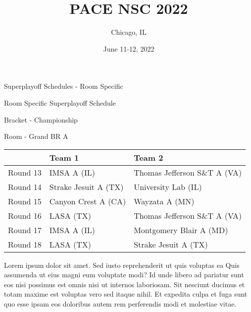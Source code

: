 \documentclass{article}%
\title{PACE NSC 2022}%
\author{Chicago, IL}%
\date{June 11{-}12, 2022}%
\begin{document}
%
\normalsize%
%
\maketitle%
\vspace*{48pt}%
\begin{center}%
\begin{Huge}%
Superplayoff Schedules {-} Room Specific%
\end{Huge}%
\end{center}%
\newpage%
\begin{center}%
\begin{Huge}%
Room Specific Superplayoff Schedule%
\end{Huge}%
\vspace*{8pt}%
\linebreak%
\begin{Large}%
Bracket {-} Championship%
\end{Large}%
\vspace*{8pt}%
\linebreak%
\vspace*{8pt}%
\begin{Large}%
Room {-} Grand BR A%
\end{Large}%
\end{center}%
%
\begin{tabularx}{\textwidth}{|c|Y|Y|}%
\hline%
&Team 1&Team 2\\%
\hline%
Round 13&IMSA A (IL)&Thomas Jefferson S\&T A (VA)\\%
Round 14&Strake Jesuit A (TX)&University Lab (IL)\\%
Round 15&Canyon Crest A (CA)&Wayzata A (MN)\\%
Round 16&LASA (TX)&Thomas Jefferson S\&T A (VA)\\%
Round 17&IMSA A (IL)&Montgomery Blair A (MD)\\%
Round 18&LASA (TX)&Strake Jesuit A (TX)\\%
\hline%
\end{tabularx}%
\vspace*{8pt}%
\newline%
Lorem ipsum dolor sit amet. Sed iusto reprehenderit ut quis voluptas ea Quis assumenda ut eius magni eum voluptate modi? Id unde libero ad pariatur sunt eos nisi possimus est omnis nisi ut internos laboriosam. Sit nesciunt ducimus et totam maxime est voluptas vero sed itaque nihil. Et expedita culpa et fuga sunt quo esse ipsam eos doloribus autem rem perferendis modi et molestiae vitae.\newline%
\end{document}
